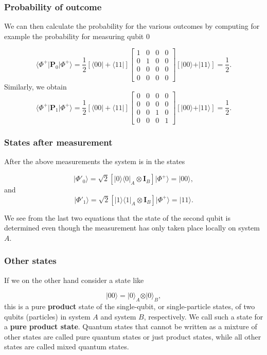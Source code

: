 \documentclass{beamer}
\begin{document}
\begin{frame}
\frametitle{Probability of  outcome}

We can then calculate the probability for the various outcomes by
computing for example the probability for measuring qubit $0$ 

\[
\langle \Phi^+\vert \bm{P}_0\vert \Phi^+\rangle = \frac{1}{2} \left[\langle 00\vert +\langle 11\vert\right]\begin{bmatrix} 1 & 0 & 0 & 0 \\ 0 & 1 & 0 & 0 \\ 0 & 0 & 0 & 0 \\ 0 & 0 & 0 & 0\end{bmatrix}\left[\vert 00\rangle +\vert 11\rangle\right]=\frac{1}{2}.
\]
Similarly, we obtain
\[
\langle \Phi^+\vert \bm{P}_1\vert \Phi^+\rangle = \frac{1}{2}\left[\langle 00\vert +\langle 11\vert\right]\begin{bmatrix} 0 & 0 & 0 & 0 \\ 0 & 0 & 0 & 0 \\ 0 & 0 & 1 & 0 \\ 0 & 0 & 0 & 1\end{bmatrix}\left[\vert 00\rangle +\vert 11\rangle\right]=\frac{1}{2}.
\]
\end{frame}

\begin{frame}
\frametitle{States after measurement}

After the above measurements the system is in the states

\[
\vert \Phi'_0 \rangle = \sqrt{2}\left[\vert 0\rangle\langle 0\vert_A\otimes \bm{I}_B\right]\vert\Phi^+\rangle=\vert 00\rangle,
\]
and 
\[
\vert \Phi'_1 \rangle = \sqrt{2}\left[\vert 1\rangle\langle 1\vert_A\otimes \bm{I}_B\right]\vert\Phi^+\rangle=\vert 11\rangle.
\]

We see from the last two equations that the state of the second qubit
is determined even though the measurement has only taken place locally
on system $A$.
\end{frame}

\begin{frame}
\frametitle{Other states}

If we on the other hand consider a state like

\[
\vert 00 \rangle = \vert 0\rangle_A\otimes \vert 0\rangle_B,
\]
this is a pure \textbf{product} state of the single-qubit, or single-particle
states, of two qubits (particles) in system $A$ and system $B$,
respectively. We call such a state for a \textbf{pure product state}.  Quantum states
that cannot be written as a mixture of other states are called pure
quantum states or just product states, while all other states are called mixed quantum states.
\end{frame}
\end{document}
